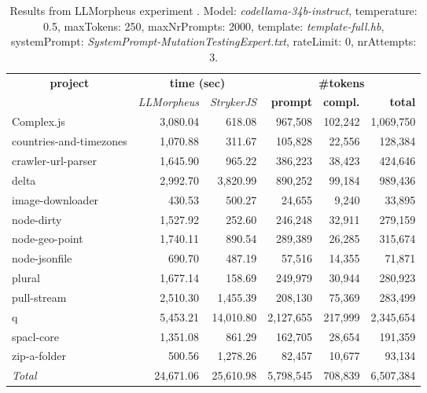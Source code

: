 
\begin{table*}[hbt!]
\centering
{\scriptsize
\begin{tabular}{l||r|r|r|r|r}
\multicolumn{1}{c|}{\bf project} & \multicolumn{2}{|c|}{\bf time (sec)} & \multicolumn{3}{|c|}{\bf \#tokens} \\
               & {\it LLMorpheus} & {\it StrykerJS} & {\bf prompt} & {\bf compl.} & {\bf total} \\
\hline
  Complex.js & 3,080.04 & 618.08 & 967,508 & 102,242 & 1,069,750 \\ 
countries-and-timezones & 1,070.88 & 311.67 & 105,828 & 22,556 & 128,384 \\ 
crawler-url-parser & 1,645.90 & 965.22 & 386,223 & 38,423 & 424,646 \\ 
delta & 2,992.70 & 3,820.99 & 890,252 & 99,184 & 989,436 \\ 
image-downloader & 430.53 & 500.27 & 24,655 & 9,240 & 33,895 \\ 
node-dirty & 1,527.92 & 252.60 & 246,248 & 32,911 & 279,159 \\ 
node-geo-point & 1,740.11 & 890.54 & 289,389 & 26,285 & 315,674 \\ 
node-jsonfile & 690.70 & 487.19 & 57,516 & 14,355 & 71,871 \\ 
plural & 1,677.14 & 158.69 & 249,979 & 30,944 & 280,923 \\ 
pull-stream & 2,510.30 & 1,455.39 & 208,130 & 75,369 & 283,499 \\ 
q & 5,453.21 & 14,010.80 & 2,127,655 & 217,999 & 2,345,654 \\ 
spacl-core & 1,351.08 & 861.29 & 162,705 & 28,654 & 191,359 \\ 
zip-a-folder & 500.56 & 1,278.26 & 82,457 & 10,677 & 93,134 \\ 
\hline
  \textit{Total} & 24,671.06 & 25,610.98 & 5,798,545 & 708,839 & 6,507,384 \\
  \end{tabular}
  }
  \\[2mm]
  \caption{Results from LLMorpheus experiment .
    Model: \textit{codellama-34b-instruct}, 
    temperature: 0.5, 
    maxTokens: 250, 
    maxNrPrompts: 2000, 
    template: \textit{template-full.hb}, 
    systemPrompt: \textit{SystemPrompt-MutationTestingExpert.txt}, 
    rateLimit: 0, 
    nrAttempts: 3.  
  }
  \label{table:Cost:run320:codellama-34b-instruct:template-full.hb:0.5}
\end{table*}